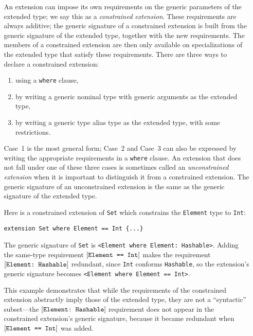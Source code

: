 \documentclass[../generics]{subfiles}
\begin{document}
An extension can impose its own requirements on the generic parameters of the extended type; we say this as a \emph{constrained extension}. These requirements are always additive; the generic signature of a constrained extension is built from the generic signature of the extended type, together with the new requirements. The members of a constrained extension are then only available on specializations of the extended type that satisfy these requirements. There are three ways to declare a constrained extension:
\begin{enumerate}
\item using a \texttt{where} clause,
\item by writing a generic nominal type with generic arguments as the extended type,
\item by writing a generic type alias type as the extended type, with some restrictions.
\end{enumerate}
Case~1 is the most general form; Case~2 and Case~3 can also be expressed by writing the appropriate requirements in a \texttt{where} clause. An extension that does not fall under one of these three cases is sometimes called an \emph{unconstrained extension} when it is important to distinguish it from a constrained extension. The generic signature of an unconstrained extension is the same as the generic signature of the extended type.

Here is a constrained extension of \texttt{Set} which constrains the \texttt{Element} type to \texttt{Int}:
\begin{Verbatim}
extension Set where Element == Int {...}
\end{Verbatim}
The generic signature of \texttt{Set} is \verb|<Element where Element: Hashable>|. Adding the same-type requirement $[\texttt{Element == Int}]$ makes the requirement $[\texttt{Element:~Hashable}]$ redundant, since \texttt{Int} conforms \texttt{Hashable}, so the extension's generic signature becomes \verb|<Element where Element == Int>|.

This example demonstrates that while the requirements of the constrained extension abstractly imply those of the extended type, they are not a ``syntactic'' subset---the $[\texttt{Element:~Hashable}]$ requirement does not appear in the constrained extension's generic signature, because it became redundant when $[\texttt{Element == Int}]$ was added.
\end{document}

